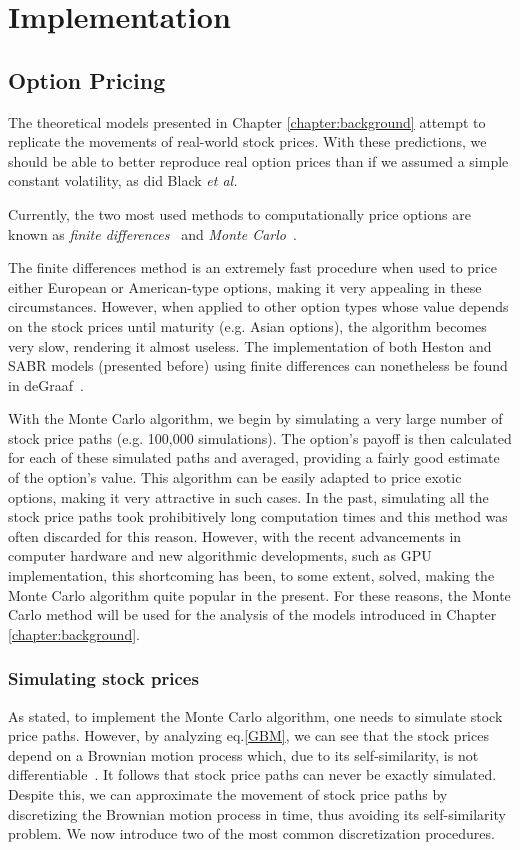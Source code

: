 \chapter{Implementation}
\label{chapter:implementation}
\section{Option Pricing}
\label{section:Option Pricing}
The theoretical models presented in Chapter \ref{chapter:background} attempt to replicate the movements of real-world stock prices. With these predictions, we should be able to better reproduce real option prices than if we assumed a simple constant volatility, as did Black \textit{et al.}

Currently, the two most used methods to computationally price options are known as \emph{finite differences}~\cite{Hull} and \emph{Monte Carlo}~\cite{Glasserman}.

The finite differences method is an extremely fast procedure when used to price either European or American-type options, making it very appealing in these circumstances. However, when applied to other option types whose value depends on the stock prices until maturity (e.g. Asian options), the algorithm becomes very slow, rendering it almost useless.
The implementation of both Heston and SABR models (presented before) using finite differences can nonetheless be found in deGraaf~\cite{deGraaf}.


With the Monte Carlo algorithm, we begin by simulating a very large number of stock price paths (e.g. 100,000 simulations). The option's payoff is then calculated for each of these simulated paths and averaged, providing a fairly good estimate of the option's value. This algorithm can be easily adapted to price exotic options, making it very attractive in such cases.
In the past, simulating all the stock price paths took prohibitively long computation times and this method was often discarded for this reason. However, with the recent advancements in computer hardware and new algorithmic developments, such as GPU implementation, this shortcoming has been, to some extent, solved, making the Monte Carlo algorithm quite popular in the present.
For these reasons, the Monte Carlo method will be used for the analysis of the models introduced in Chapter \ref{chapter:background}.


\subsection{Simulating stock prices}
\label{subsection:Simulating stock prices}
As stated, to implement the Monte Carlo algorithm, one needs to simulate stock price paths. However, by analyzing eq.\eqref{GBM}, we can see that the stock prices depend on a Brownian motion process which, due to its self-similarity, is not differentiable~\cite{Mikosch}. It follows that stock price paths can never be exactly simulated. Despite this, we can approximate the movement of stock price paths by discretizing the Brownian motion process in time, thus avoiding its self-similarity problem. We now introduce two of the most common discretization procedures.


